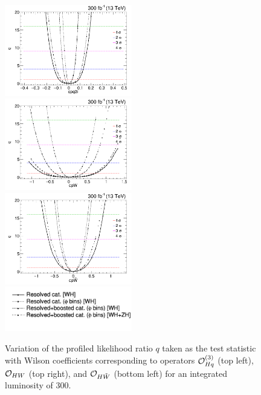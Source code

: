 \documentclass[a4paper,11pt]{article}
\begin{document}
\begin{figure}[hbtp]
\begin{center}
\includegraphics[width=0.495\textwidth]{Figures/New/RECO/Full_NLL_WC_cpq3i_2019_opt2.png}
\includegraphics[width=0.495\textwidth]{Figures/New/RECO/Full_NLL_WC_cpW_2019_opt2.png}
\includegraphics[width=0.495\textwidth]{Figures/New/RECO/Full_NLL_WC_cpWtilde_2019_opt2.png}
\includegraphics[width=0.495\textwidth]{Figures/New/RECO/Selection_276.png}
\end{center}
\caption{
Variation of the profiled likelihood ratio $q$ taken as the test statistic
with Wilson coefficients corresponding to operators ${\cal O}^{(3)}_{Hq}$ (top left), ${\cal O}_{HW}$ (top right), and ${\cal O}_{H\tilde{W}}$ (bottom left) for an integrated luminosity of 300\fbinv.
}
\label{fig:NLL}
\end{figure}
\end{document}

